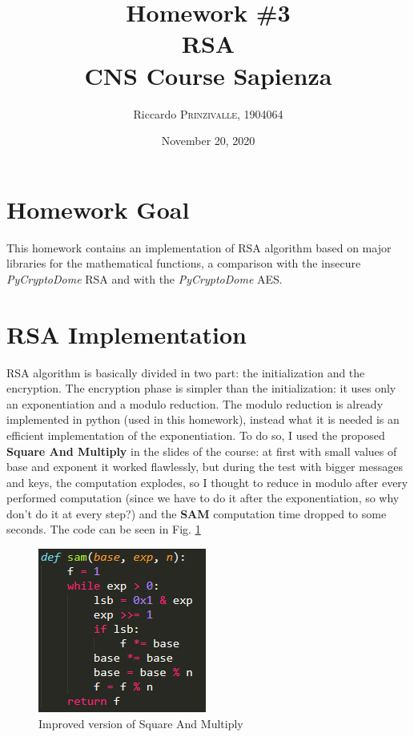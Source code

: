\documentclass{article}
\title{Homework \#3 \\RSA \\[0.2em]\small{}CNS Course Sapienza} %
\author{Riccardo \textsc{Prinzivalle}, 1904064} %
\date{November 20, 2020} %
\begin{document}
\maketitle %


\section{Homework Goal}

This homework contains an implementation of RSA algorithm based on major libraries for the mathematical functions, a comparison with the insecure \textit{PyCryptoDome} RSA and with the \textit{PyCryptoDome} AES.


\section{RSA Implementation}

RSA algorithm is basically divided in two part: the initialization and the encryption. The encryption phase is simpler than the initialization: it uses only an exponentiation and a modulo reduction. The modulo reduction is already implemented in python (used in this homework), instead what it is needed is an efficient implementation of the exponentiation. To do so, I used the proposed \textbf{Square And Multiply} in the slides of the course: at first with small values of base and exponent it worked flawlessly, but during the test with bigger messages and keys, the computation explodes, so I thought to reduce in modulo after every performed computation (since we have to do it after the exponentiation, so why don't do it at every step?) and the \textbf{SAM} computation time dropped to some seconds. The code can be seen in Fig. \ref{fig:sam}

\begin{figure}[H]
	\centering
	\includegraphics[width=0.345\linewidth]{images/SAM.png}
	\caption{Improved version of Square And Multiply}
	\label{fig:sam}
\end{figure}
\end{document}

